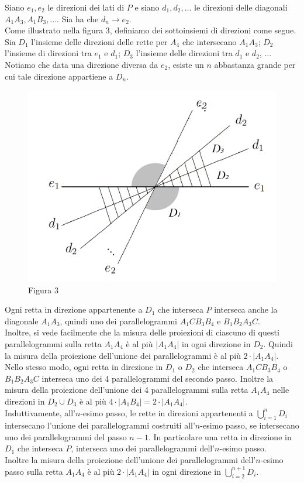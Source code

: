 \documentclass[a4paper, twoside,openright]{article}
\newcommand{\<}{\langle}
\renewcommand{\>}{\rangle}
\begin{document}
Siano $e_{1}, e_{2}$ le direzioni dei lati di $P$ e siano $d_{1}, d_{2}, \ldots$ le direzioni delle diagonali $A_{1} A_{3}, A_{1} B_{3},...$. Sia ha che $d_{n} \rightarrow e_{2}$.\\
Come illustrato nella figura 3, definiamo dei sottoinsiemi di direzioni come segue. Sia $D_1$ l'insieme delle direzioni delle rette per $A_{4}$ che intersecano $A_{1} A_{3}$; $D_2$ l'insieme di direzioni tra $e_{1}$ e $d_{1}$; $D_3$ l'insieme delle direzioni tra $d_{1}$ e $d_{2}$, ...\\
Notiamo che data una direzione diversa da $e_2$, esiste un $n$ abbastanza grande per cui tale direzione appartiene a $D_n$.

\begin{figure} [h!]
		\includegraphics[width=0.6\columnwidth]{direzioni.png}
		\centering
		\caption{Figura 3}
\end{figure}


Ogni retta in direzione appartenente a $D_1$ che interseca $P$ interseca anche la diagonale $A_{1} A_{3}$, quindi uno dei parallelogrammi $A_{1} C B_{3} B_{4}$ e $B_{1} B_{2} A_{3} C$.\\
Inoltre, si vede facilmente che la misura delle proiezioni di ciascuno di questi parallelogrammi sulla retta $A_{1} A_{4}$ è al più $\left|A_{1} A_{4}\right|$ in ogni direzione in $D_2$. Quindi la misura della proiezione dell'unione dei parallelogrammi è al più $2 \cdot\left|A_{1} A_{4}\right|$.\\
Nello stesso modo, ogni retta in direzione in $D_1$ o $D_2$ che interseca $A_{1} C B_{3} B_{4}$ o $B_{1} B_{2} A_{3} C$ interseca uno dei 4 parallelogrammi del secondo passo. Inoltre la misura della proiezione dell'unione dei 4 parallelogrammi sulla retta $A_{1} A_{4}$ nelle direzioni in $D_2 \cup D_3$ è al più $4 \cdot\left|A_{1} B_{4}\right|=2 \cdot\left|A_{1} A_{4}\right|$.\\

Induttivamente, all'$n$-esimo passo, le rette in direzioni appartenenti a $\bigcup_{i=1}^n D_i$ intersecano l'unione dei parallelogrammi costruiti all'$n$-esimo passo, se intersecano uno dei parallelogrammi del passo $n-1$. In particolare una retta in direzione in $D_1$ che interseca $P$, interseca uno dei parallelogrammi dell'$n$-esimo passo.\\
Inoltre la misura della proiezione dell'unione dei parallelogrammi dell'$n$-esimo passo sulla retta $A_{1} A_{4}$ è al più $2 \cdot\left|A_{1} A_{4}\right|$ in ogni direzione in $\bigcup_{i=2}^{n+1}D_i$.\\
\end{document}
